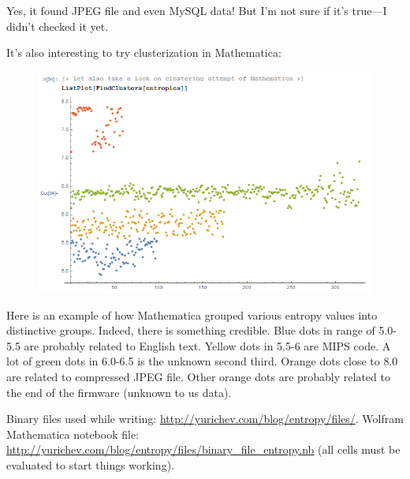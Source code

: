 Yes, it found JPEG file and even MySQL data!
But I'm not sure if it's true---I didn't checked it yet.

It's also interesting to try clusterization in Mathematica:

\begin{figure}[H]
\centering
\includegraphics[scale=\FigScale]{ff/entropy/dashcam_clusters.png}
\end{figure}

Here is an example of how Mathematica grouped various entropy values into distinctive groups.
Indeed, there is something credible. Blue dots in range of 5.0-5.5 are probably related to English text.
Yellow dots in 5.5-6 are MIPS code. A lot of green dots in 6.0-6.5 is the unknown second third.
Orange dots close to 8.0 are related to compressed JPEG file.
Other orange dots are probably related to the end of the firmware (unknown to us data).


Binary files used while writing: \url{http://yurichev.com/blog/entropy/files/}.
Wolfram Mathematica notebook file: \url{http://yurichev.com/blog/entropy/files/binary_file_entropy.nb}
(all cells must be evaluated to start things working).

